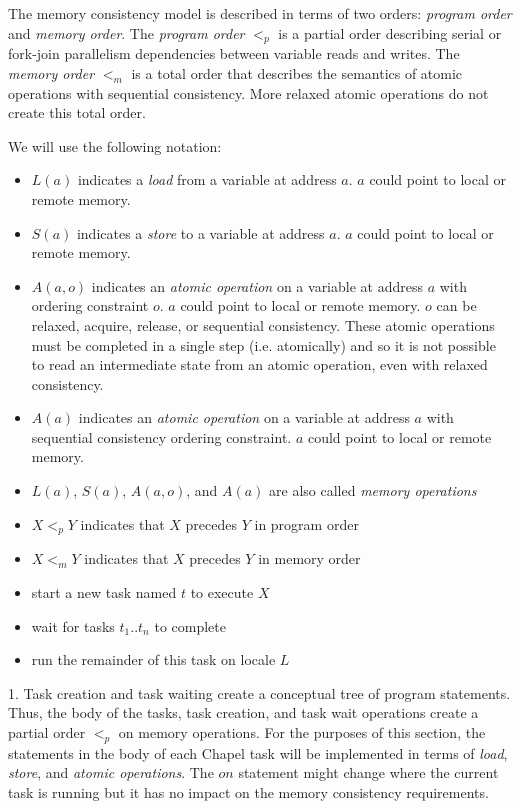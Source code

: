 The memory consistency model is described in terms of two orders:
\textit{program order} and \textit{memory order}. The \textit{program order}
$<_p$ is a partial order describing serial or fork-join parallelism
dependencies between variable reads and writes. The \textit{memory order} $<_m$
is a total order that describes the semantics of atomic operations with
sequential consistency. More relaxed atomic operations do not create this total
order.

We will use the following notation:
\begin{itemize}

  \item $L(a)$ indicates a \textit{load} from a variable at address $a$.  $a$
could point to local or remote memory.

  \item $S(a)$ indicates a \textit{store} to a variable at address $a$.  $a$
could point to local or remote memory.

  \item $A(a,o)$ indicates an \textit{atomic operation} on a variable at
address $a$ with ordering constraint $o$. $a$ could point to local or remote
memory.  $o$ can be relaxed, acquire, release, or sequential consistency. These
atomic operations must be completed in a single step (i.e. atomically) and so
it is not possible to read an intermediate state from an atomic operation, even
with relaxed consistency.

  \item $A(a)$ indicates an \textit{atomic operation} on a variable at address
$a$ with sequential consistency ordering constraint. $a$ could point to local
or remote memory.

  \item $L(a)$, $S(a)$, $A(a,o)$, and $A(a)$ are also called \textit{memory operations}
  \item $X <_p Y$ indicates that $X$ precedes $Y$ in program order
  \item $X <_m Y$ indicates that $X$ precedes $Y$ in memory order
  \item {} start a new task named $t$ to execute $X$
  \item {} wait for tasks $t_1..t_n$ to complete
  \item {} run the remainder of this task on locale $L$
\end{itemize}

1. Task creation and task waiting create a conceptual tree of program
statements. Thus, the body of the tasks, task creation, and task wait
operations create a partial order $<_p$ on memory operations.  
For the purposes of this section, the statements in the body of each
Chapel task will be implemented in terms of \textit{load}, \textit{store}, and
\textit{atomic operations}. The $on$ statement might change where the current
task is running but it has no impact on the memory consistency requirements.

